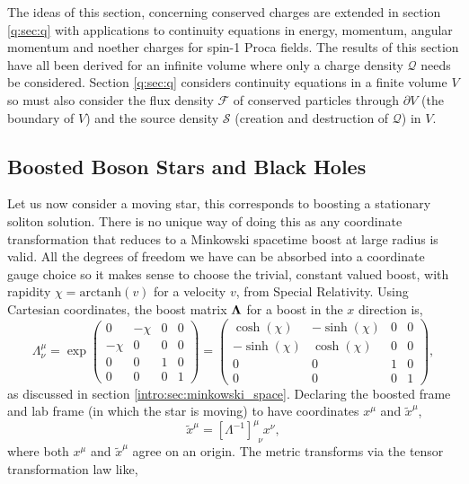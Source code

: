 The ideas of this section, concerning conserved charges are extended in section \ref{q:sec:q} with applications to continuity equations in energy, momentum, angular momentum and noether charges for spin-1 Proca fields. The results of this section have all been derived for an infinite volume where only a charge density $\mathcal{Q}$ needs be considered. Section \ref{q:sec:q} considers continuity equations in a finite volume $V$ so must also consider the flux density $\mathcal{F}$ of conserved particles through $\partial V$ (the boundary of $V$) and the source density $\mathcal{S}$ (creation and destruction of $\mathcal{Q}$) in $V$. 

\subsection{Boosted Boson Stars and Black Holes}\label{boson:sec:boost}
Let us now consider a moving star, this corresponds to boosting a stationary soliton solution. There is no unique way of doing this as any coordinate transformation that reduces to a Minkowski spacetime boost at large radius is valid. All the degrees of freedom we have can be absorbed into a coordinate gauge choice so it makes sense to choose the trivial, constant valued boost, with rapidity $\chi = \mathrm{arctanh} (v)$ for a velocity $v$, from Special Relativity. Using Cartesian coordinates, the boost matrix $\boldsymbol{\Lambda}$ for a boost in the $x$ direction is,
\begin{equation}
\Lambda_\nu^\mu =  \exp\begin{pmatrix} 0 & -\chi & 0& 0 \\ -\chi & 0 & 0 & 0\\ 0 & 0&1&0 \\ 0&0&0&1\end{pmatrix} = \begin{pmatrix} \cosh(\chi) & -\sinh(\chi) & 0& 0 \\ -\sinh(\chi) & \cosh(\chi) & 0 & 0\\ 0 & 0&1&0 \\ 0&0&0&1\end{pmatrix},
\end{equation}
as discussed in section \ref{intro:sec:minkowski_space}. Declaring the boosted frame and lab frame (in which the star is moving) to have coordinates $x^\mu$ and $\tilde{x}^\mu$, 
\begin{equation}
\tilde{x}^\mu = [\Lambda^{-1}]^{\mu}_{\,\,\,\nu}x^{\nu},
\end{equation}
where both $x^\mu$ and $\tilde{x}^\mu$ agree on an origin. The metric transforms via the tensor transformation law like,
